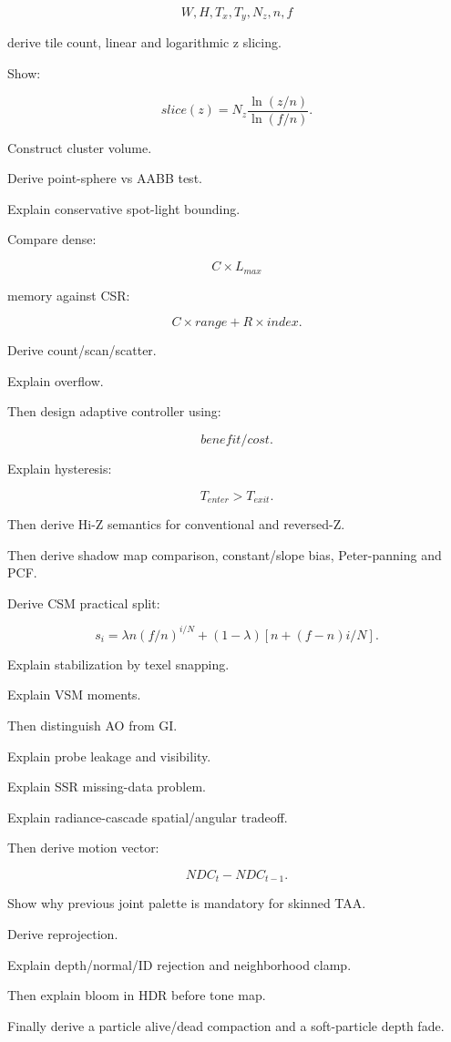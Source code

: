 \[
W,H,T_x,T_y,N_z,n,f
\]

derive tile count, linear and logarithmic z slicing.

Show:

\[
slice(z)
=
N_z
\frac{
\ln(z/n)
}{
\ln(f/n)
}.
\]

Construct cluster volume.

Derive point-sphere vs AABB test.

Explain conservative spot-light bounding.

Compare dense:

\[
C\times L_{max}
\]

memory against CSR:

\[
C\times range+
R\times index.
\]

Derive count/scan/scatter.

Explain overflow.

Then design adaptive controller using:

\[
benefit/cost.
\]

Explain hysteresis:

\[
T_{enter}>T_{exit}.
\]

Then derive Hi-Z semantics for conventional and reversed-Z.

Then derive shadow map comparison, constant/slope bias, Peter-panning and PCF.

Derive CSM practical split:

\[
s_i=
\lambda
n(f/n)^{i/N}
+
(1-\lambda)
[n+(f-n)i/N].
\]

Explain stabilization by texel snapping.

Explain VSM moments.

Then distinguish AO from GI.

Explain probe leakage and visibility.

Explain SSR missing-data problem.

Explain radiance-cascade spatial/angular tradeoff.

Then derive motion vector:

\[
NDC_t-NDC_{t-1}.
\]

Show why previous joint palette is mandatory for skinned TAA.

Derive reprojection.

Explain depth/normal/ID rejection and neighborhood clamp.

Then explain bloom in HDR before tone map.

Finally derive a particle alive/dead compaction and a soft-particle depth fade.

